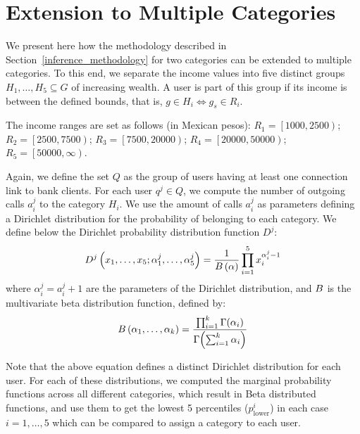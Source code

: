 \section{Extension to Multiple Categories}

We present here how the methodology described in Section~\ref{inference_methodology} for
two categories can be extended to multiple categories.
To this end, we separate the income values into five distinct groups $ H_1, \ldots, H_5 \subseteq G$ of increasing wealth. A user is part of this group if its income is between the defined bounds, that is, \( g \in H_i \iff g_s \in R_i \).

The income ranges are set as follows (in Mexican pesos):
	$R_1 = \left[1000, 2500\right) $;
	$R_2 = \left[2500, 7500\right) $;
	$R_3 = \left[7500, 20000\right) $;
	$R_4 = \left[20000, 50000\right) $;
	$R_5 = \left[50000, \infty\right) $.

Again, we define the set $Q$ as the group of users having at least one connection link to bank clients. For each user $q^j \in Q$, we compute the number of outgoing calls $a^j_i$ to the category $H_i$.
We use the amount of calls $a^j_i$  as parameters defining a Dirichlet distribution for the probability of belonging to each category.
We define below the Dirichlet probability distribution function $D^j$:
\begin{equation}
D^j \left( x_1, \ldots, x_5; \alpha^j_1, \ldots, \alpha^j_5 \right) = \frac{1}{B \left( \alpha \right)} \prod^5_{i = 1} x_i^{\alpha^j_i - 1}
\label{Dirichlet}
\end{equation}
where $\alpha^j_i = a^j_i +1$ are the parameters of the Dirichlet distribution, and $B$ is the multivariate beta distribution function, defined by: %
\begin{equation}
B \left( \alpha_1, \ldots, \alpha_k \right) = \frac{\prod^k_{i = 1} \Gamma \! \left( \alpha_i \right)}{\Gamma \! \left( \sum^k_{i = 1} \alpha_i \right) }
\label{Beta}
\end{equation}

Note that the above equation defines a distinct Dirichlet distribution for each user. For each of these distributions, we computed the marginal probability functions across all different categories, which result in Beta distributed functions, and use them to get the lowest 5 percentiles (\(p^i_{\operatorname{lower}}\)) in each case ${i=1, \ldots, 5}$ which can be compared to assign a category to each user.

